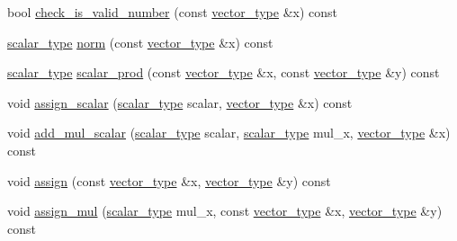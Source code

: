 \begin{DoxyCompactItemize}
bool \hyperlink{structcpu__vector__operations_a1a662c7c6f4dba1119c5dd63777ef2ab}{check\-\_\-is\-\_\-valid\-\_\-number} (const \hyperlink{structcpu__vector__operations_a1962836df596ce262704d208e9a6d8f9}{vector\-\_\-type} \&x) const 
\item 
\hyperlink{structcpu__vector__operations_aca6b216aa1fb172df83d98350e94fd61}{scalar\-\_\-type} \hyperlink{structcpu__vector__operations_abb4a0ddd5d65ef1ae8c979e71da96ba8}{norm} (const \hyperlink{structcpu__vector__operations_a1962836df596ce262704d208e9a6d8f9}{vector\-\_\-type} \&x) const 
\item 
\hyperlink{structcpu__vector__operations_aca6b216aa1fb172df83d98350e94fd61}{scalar\-\_\-type} \hyperlink{structcpu__vector__operations_a4c4fcf653cf773cb4819add09dbd1e49}{scalar\-\_\-prod} (const \hyperlink{structcpu__vector__operations_a1962836df596ce262704d208e9a6d8f9}{vector\-\_\-type} \&x, const \hyperlink{structcpu__vector__operations_a1962836df596ce262704d208e9a6d8f9}{vector\-\_\-type} \&y) const 
\item 
void \hyperlink{structcpu__vector__operations_a2efc001178974db349c1ecbc6a60a98f}{assign\-\_\-scalar} (\hyperlink{structcpu__vector__operations_aca6b216aa1fb172df83d98350e94fd61}{scalar\-\_\-type} scalar, \hyperlink{structcpu__vector__operations_a1962836df596ce262704d208e9a6d8f9}{vector\-\_\-type} \&x) const 
\item 
void \hyperlink{structcpu__vector__operations_a2a20e02394094c974f96f4e9063fb649}{add\-\_\-mul\-\_\-scalar} (\hyperlink{structcpu__vector__operations_aca6b216aa1fb172df83d98350e94fd61}{scalar\-\_\-type} scalar, \hyperlink{structcpu__vector__operations_aca6b216aa1fb172df83d98350e94fd61}{scalar\-\_\-type} mul\-\_\-x, \hyperlink{structcpu__vector__operations_a1962836df596ce262704d208e9a6d8f9}{vector\-\_\-type} \&x) const 
\item 
void \hyperlink{structcpu__vector__operations_aee016bc7ac6cc3a7149d3444e5b0ac57}{assign} (const \hyperlink{structcpu__vector__operations_a1962836df596ce262704d208e9a6d8f9}{vector\-\_\-type} \&x, \hyperlink{structcpu__vector__operations_a1962836df596ce262704d208e9a6d8f9}{vector\-\_\-type} \&y) const 
\item 
void \hyperlink{structcpu__vector__operations_aa8a06e53a83c6b3b3e3efddcd75065da}{assign\-\_\-mul} (\hyperlink{structcpu__vector__operations_aca6b216aa1fb172df83d98350e94fd61}{scalar\-\_\-type} mul\-\_\-x, const \hyperlink{structcpu__vector__operations_a1962836df596ce262704d208e9a6d8f9}{vector\-\_\-type} \&x, \hyperlink{structcpu__vector__operations_a1962836df596ce262704d208e9a6d8f9}{vector\-\_\-type} \&y) const 

\end{DoxyCompactItemize}
